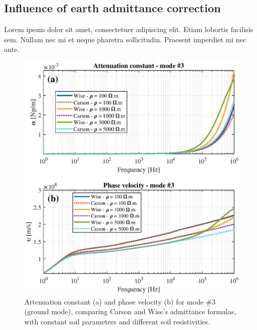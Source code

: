 \documentclass[lettersize,journal]{IEEEtran}
\newcommand*{\shortblindtext}{Lorem ipsum dolor sit amet, consectetuer adipiscing elit. Etiam lobortis facilisis sem. Nullam nec mi et neque pharetra sollicitudin. Praesent imperdiet mi nec ante.}
\begin{document}
\subsection{Influence of earth admittance correction}

\shortblindtext
\begin{figure}[ht]
	\centering
	\label{fig:WisCarPropag_noratio___const_model_mode3}
	\includegraphics[width=1\columnwidth]{./fig/WisCarPropag_noratio___const_model_mode3.eps}
	\caption{Attenuation constant (a) and phase velocity (b) for mode \#3 (ground mode), comparing Carson and Wise's admittance formulas, with constant soil parameters and different soil resistivities.}
\end{figure}
\end{document}
